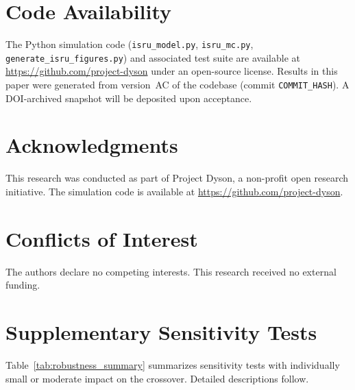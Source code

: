 \documentclass[preprint,12pt]{elsarticle}
\begin{document}
\section*{Code Availability}

The Python simulation code (\texttt{isru\_model.py}, \texttt{isru\_mc.py}, \texttt{generate\_isru\_figures.py}) and associated test suite are available at \url{https://github.com/project-dyson} under an open-source license. Results in this paper were generated from version~AC of the codebase (commit \texttt{COMMIT\_HASH}). A DOI-archived snapshot will be deposited upon acceptance.


\section*{Acknowledgments}

This research was conducted as part of Project Dyson, a non-profit open research initiative. The simulation code is available at \url{https://github.com/project-dyson}.

\section*{Conflicts of Interest}

The authors declare no competing interests. This research received no external funding.

\appendix
\section{Supplementary Sensitivity Tests}
\label{sec:appendix_sensitivity}

Table~\ref{tab:robustness_summary} summarizes sensitivity tests with individually small or moderate impact on the crossover. Detailed descriptions follow.
\end{document}
